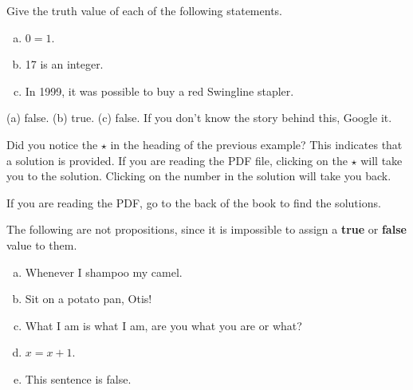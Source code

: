 \begin{exer}
Give the truth value of each of the following statements.
\begin{enumerate}[(a)]
\item {} $0=1$.
\item {} 17 is an integer.
\item {} In 1999, it was possible to buy a red Swingline stapler.
\end{enumerate}
\begin{answer}
(a) false. (b) true. 
(c) false.  If you don't know the story behind this, Google it.
\end{answer}
\end{exer}

\begin{rem}
Did you notice the $\star$ in the heading of the previous example?  
This indicates that a solution is provided.
If you are reading the PDF file, clicking on the $\star$ will take you to the solution.
Clicking on the number in the solution will take you back. 

If you are reading the PDF, go to the back of the book to find the solutions.
\end{rem}

\begin{exa}
The following are not propositions, since it is impossible
to assign a {\bf true} or {\bf false} value to them.
\begin{enumerate}[(a)]
\item Whenever I shampoo my camel. 
\item Sit on a potato pan, Otis! 
\item What I am is what I am, are you what you are or what?
\item $x = x + 1$. 
\item This sentence is false.
\end{enumerate}
\end{exa}

